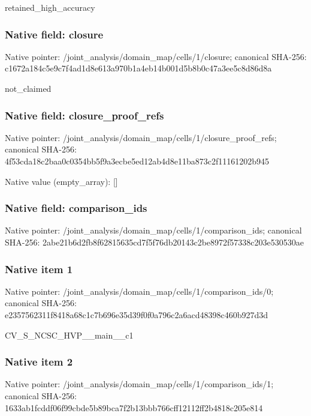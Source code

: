 \documentclass[10pt,a4paper]{article}
\begin{document}
\begingroup\raggedright\sloppy retained\_\allowbreak{}high\_\allowbreak{}accuracy\par\endgroup

\subsubsection{Native field: closure}
Native pointer: /joint\_\allowbreak{}analysis/domain\_\allowbreak{}map/cells/1/closure; canonical SHA-256: c1672a184c5e9c7f4ad1d8e613a970b1a4eb14b001d5b8b0c47a3ee5c8d86d8a

\begingroup\raggedright\sloppy not\_\allowbreak{}claimed\par\endgroup

\subsubsection{Native field: closure\_\allowbreak{}proof\_\allowbreak{}refs}
Native pointer: /joint\_\allowbreak{}analysis/domain\_\allowbreak{}map/cells/1/closure\_\allowbreak{}proof\_\allowbreak{}refs; canonical SHA-256: 4f53cda18c2baa0c0354bb5f9a3ecbe5ed12ab4d8e11ba873c2f11161202b945

Native value (empty\_\allowbreak{}array): []

\subsubsection{Native field: comparison\_\allowbreak{}ids}
Native pointer: /joint\_\allowbreak{}analysis/domain\_\allowbreak{}map/cells/1/comparison\_\allowbreak{}ids; canonical SHA-256: 2abe21b6d2fb8f62815635cd7f5f76db20143c2be8972f57338c203e530530ae

\subsubsection{Native item 1}
Native pointer: /joint\_\allowbreak{}analysis/domain\_\allowbreak{}map/cells/1/comparison\_\allowbreak{}ids/0; canonical SHA-256: e2357562311f8418a68c1c7b696e35d39f0f0a796c2a6acd48398c460b927d3d

\begingroup\raggedright\sloppy CV\_\allowbreak{}S\_\allowbreak{}NCSC\_\allowbreak{}HVP\_\allowbreak{}\_\allowbreak{}main\_\allowbreak{}\_\allowbreak{}c1\par\endgroup

\subsubsection{Native item 2}
Native pointer: /joint\_\allowbreak{}analysis/domain\_\allowbreak{}map/cells/1/comparison\_\allowbreak{}ids/1; canonical SHA-256: 1633ab1fcddf06f99cbde5b89bca7f2b13bbb766cff12112ff2b4818c205e814
\end{document}
